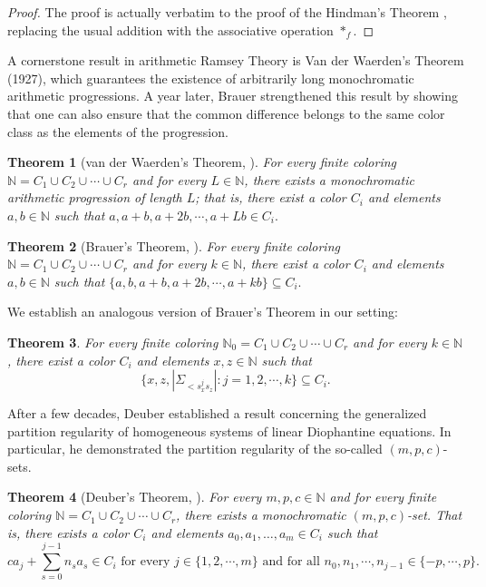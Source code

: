 \documentclass[12pt]{amsart}
\theoremstyle{plain}
\newtheorem{theorem}{Theorem}[section]
\theoremstyle{definition}
\theoremstyle{remark}
\numberwithin{equation}{section}
\begin{document}
\begin{proof}
The proof is actually verbatim to the proof of the Hindman's Theorem \cite[Theorem 5.8]{HS12}, replacing the usual addition with the associative operation $\ast_f$.
\end{proof}

A cornerstone result in arithmetic Ramsey Theory is Van der Waerden's Theorem (1927), which guarantees the existence of arbitrarily long monochromatic arithmetic progressions. A year later, Brauer strengthened this result by showing that one can also ensure that the common difference belongs to the same color class as the elements of the progression.

\begin{theorem}[van der Waerden's Theorem, \cite{Van27}]
For every finite coloring $\mathbb{N} = C_1 \cup C_2 \cup \cdots \cup C_r$ and for every $L \in \mathbb{N}$, there exists a monochromatic arithmetic progression of length $L$; that is, there exist a color $C_i$ and elements $a, b \in \mathbb{N}$ such that
$a, a+b, a+2b, \cdots , a+Lb \in C_i.$
\end{theorem}

\begin{theorem}[Brauer's Theorem, \cite{Brauer28}]
For every finite coloring $\mathbb{N} = C_1 \cup C_2 \cup \cdots \cup C_r$ and for every $k \in \mathbb{N}$, there exist a color $C_i$ and elements $a, b \in \mathbb{N}$ such that
 $\{a, b, a+b, a+2b, \cdots , a+kb\} \subseteq C_i.$
\end{theorem}

We establish an analogous version of Brauer's Theorem in our setting:

\begin{theorem} \label{Brauer}
For every finite coloring $\mathbb{N}_0 = C_1 \cup C_2 \cup \cdots \cup C_r$ and for every $k \in \mathbb{N}$, there exist a color $C_i$ and elements $x, z \in \mathbb{N}$ such that
$$\{x, z, |\Sigma_{<{s_x^j}s_z}|: j=1,2, \cdots, k\} \subseteq C_i.$$
\end{theorem}




After a few decades, Deuber established a result concerning the generalized partition regularity of homogeneous systems of linear Diophantine equations. In particular, he demonstrated the partition regularity of the so-called $(m,p,c)$-sets.

\begin{theorem}[Deuber's Theorem, \cite{Deuber74}]
\label{deuber}
For every $m, p, c \in \mathbb{N}$ and for every finite coloring $\mathbb{N}= C_1 \cup C_2  \cup \cdots \cup C_r$, there exists a monochromatic $(m,p,c)$-set. That is, there exists a color $C_i$ and elements $a_0, a_1, \dots, a_m \in C_i$ such that
 \[ca_j + \sum_{s=0}^{j-1} n_s a_s \in C_i \mbox{ for every } j \in \{1,2, \cdots, m \} \mbox{ and for all } n_0, n_1, \cdots , n_{j-1} \in \{-p, \cdots, p\}.\] 
\end{theorem}
\end{document}

